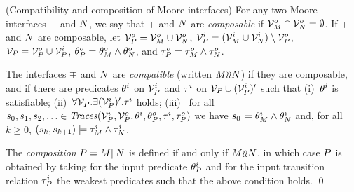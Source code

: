 \begin{defi}{(Compatibility and composition of Moore interfaces)} 
\label{def-moore-compatible} 
For any two Moore interfaces $\mp$ and $N$, we say that 
$\mp$ and $N$ are {\em composable\/} if 
${\cal V}^o_M \cap {\cal V}^o_N = \emptyset$. 
If $\mp$ and $N$ are composable, let
${\cal V}^o_P = {\cal V}^o_M \cup {\cal V}^o_N$, 
${\cal V}^i_P = ({\cal V}^i_M \cup {\cal V}^i_N) \setminus {\cal V}^o_P$, 
${\cal V}_P = {\cal V}^o_P \cup {\cal V}^i_P$, 
$\theta^o_P = \theta^o_M \wedge \theta^o_N$, and 
$\tau^o_P = \tau^o_M \wedge \tau^o_N$.

The interfaces $\mp$ and $N$ are {\em compatible\/} 
(written $M{\wr}{\wr}N$) if they are composable, and if there are
predicates $\theta^i$ on ${\cal V}^i_P$ and 
$\tau^i$ on ${\cal V}_P \cup ({\cal V}^i_P)'$ such that 
(i)~$\theta^i$ is satisfiable; 
(ii)~$\forall {\cal V}_P . \exists ({\cal V}^i_P)' . \tau^i$ holds; 
(iii)~ for all $s_0, s_1, s_2, \ldots \in {\text{\textit{Traces}}}({\cal V}^i_P, {\cal V}^o_P,
\theta^i, \theta^o_P, \tau^i, \tau^o_P)$ we have 
$s_0 \models \theta^i_M \wedge \theta^i_N$ and, for all $k \geq 0$, 
$(s_k, s_{k+1}) \models \tau^i_M \wedge \tau^i_N$.

The {\em composition\/} $P = M \| N$ is defined if and only if
$M{\wr}{\wr}N$, in which case $P$ is obtained by
taking for the input predicate $\theta^i_P$ and for the input
transition relation $\tau^i_P$ the weakest predicates such that the
above condition holds. 
\qed
\end{defi}

